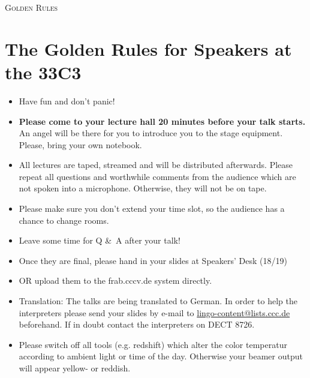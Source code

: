 \documentclass[paper=a4]{scrartcl}
\begin{document}
	\begin{center} \textsc{\Huge Golden Rules}\end{center}
	\hfill
	\section*{The Golden Rules for Speakers at the 33C3}
	\begin{itemize}
		\item Have fun and don't panic!
		\item \textbf{Please come to your lecture hall 20 minutes before your talk starts.} An
		angel will be there	for	you	to introduce you to	the stage equipment. Please, bring your own notebook.
		\item All lectures are taped, streamed and will be distributed afterwards. Please repeat all questions and worthwhile comments from the audience which are not spoken into a microphone. Otherwise, they will not be on tape.
		\item Please make sure you don't extend your time slot, so the audience has a chance to change rooms.
		\item Leave some time for Q \&\ A after your talk!
		\item Once they are final, please hand in your slides at Speakers' Desk (18/19) 
		\item[] OR upload them to the frab.cccv.de system directly.
		\item Translation: The talks are being translated to German. In order to help the interpreters please send your slides by e-mail to \url{lingo-content@lists.ccc.de} beforehand. If in doubt contact the interpreters on DECT 8726.
		\item Please switch off all tools (e.g. redshift) which alter the color temperatur according to ambient light or time of the day. Otherwise your beamer output will appear yellow- or reddish.
	\end{itemize}
\end{document}
